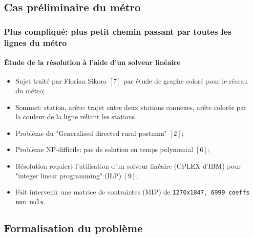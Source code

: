 \documentclass[10pt]{beamer}
\begin{document}
\subsection{Cas préliminaire du métro}

\begin{frame}
\frametitle{Plus compliqué: plus petit chemin passant par toutes les lignes du métro}
\framesubtitle{Étude de la résolution à l'aide d'un solveur linéaire}
\begin{itemize}
\item Sujet traité par Florian Sikora $[7]$ par étude de graphe coloré pour le réseau du métro;
\item Sommet: station, arête: trajet entre deux stations connexes, arête colorée par la couleur de la ligne reliant les stations
\item Problème du "Generalised directed rural postman" $[2]$;
\item Problème NP-difficile: pas de solution en temps polynomial $[6]$;
\item Résolution requiert l'utilisation d’un solveur linéaire (CPLEX d'IBM) pour "integer linear programming" (ILP) $[9]$;
\item Fait intervenir une matrice de contraintes (MIP) de \texttt{1270x1847, 6999 coeffs non nuls}.
\end{itemize}
\end{frame}

\subsection{Formalisation du problème}
\end{document}
